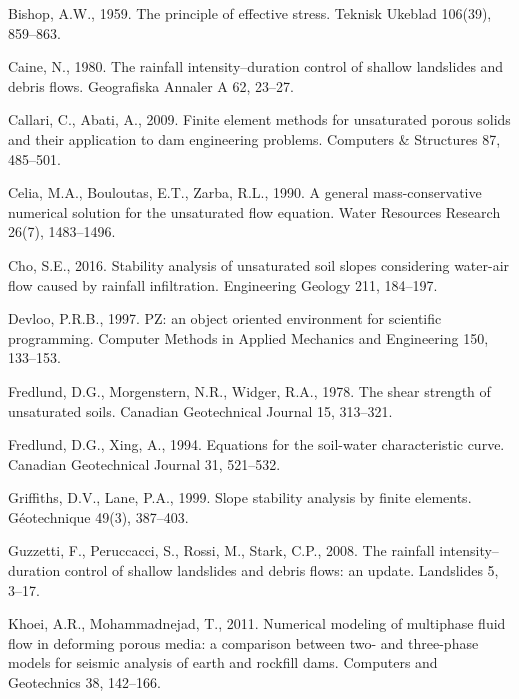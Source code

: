 Bishop, A.W., 1959. The principle of effective stress. Teknisk Ukeblad 106(39), 859--863.

Caine, N., 1980. The rainfall intensity--duration control of shallow landslides and debris flows. Geografiska
Annaler A 62, 23--27.

Callari, C., Abati, A., 2009. Finite element methods for unsaturated porous solids and their application to dam
engineering problems. Computers \& Structures 87, 485--501.

Celia, M.A., Bouloutas, E.T., Zarba, R.L., 1990. A general mass-conservative numerical solution for the unsaturated
flow equation. Water Resources Research 26(7), 1483--1496.

Cho, S.E., 2016. Stability analysis of unsaturated soil slopes considering water-air flow caused by rainfall
infiltration. Engineering Geology 211, 184--197. %

Devloo, P.R.B., 1997. PZ: an object oriented environment for scientific programming. Computer Methods in Applied
Mechanics and Engineering 150, 133--153.

Fredlund, D.G., Morgenstern, N.R., Widger, R.A., 1978. The shear strength of unsaturated soils. Canadian
Geotechnical Journal 15, 313--321.

Fredlund, D.G., Xing, A., 1994. Equations for the soil-water characteristic curve. Canadian Geotechnical Journal
31, 521--532.

Griffiths, D.V., Lane, P.A., 1999. Slope stability analysis by finite elements. G\'eotechnique 49(3), 387--403.

Guzzetti, F., Peruccacci, S., Rossi, M., Stark, C.P., 2008. The rainfall intensity--duration control of shallow
landslides and debris flows: an update. Landslides 5, 3--17.

Khoei, A.R., Mohammadnejad, T., 2011. Numerical modeling of multiphase fluid flow in deforming porous media: a
comparison between two- and three-phase models for seismic analysis of earth and rockfill dams. Computers and
Geotechnics 38, 142--166.

